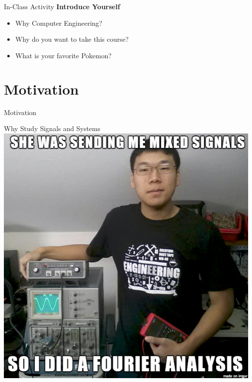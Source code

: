 \documentclass[aspectratio=169,xcolor=dvipsnames,svgnames,x11names,fleqn]{beamer}
\begin{document}
\begin{frame}{In-Class Activity}
  \centering
  \textbf{Introduce Yourself} \\[1em]
  
  \begin{block}{}
    \begin{itemize}
      \item Why Computer Engineering?
      \item Why do you want to take this course?
      \item What is your favorite Pokemon?
    \end{itemize}
  \end{block}

\end{frame}

\section{Motivation}


\begin{frame}{}
    \begin{center}
    \Huge \bf \color{DarkBlue}
    \faFire
    
    Motivation
\end{center}
\end{frame}


\begin{frame}{Why Study Signals and Systems}
\centering
    \includegraphics[width=0.4\linewidth]{figures/motivation.png}
\end{frame}
\end{document}
